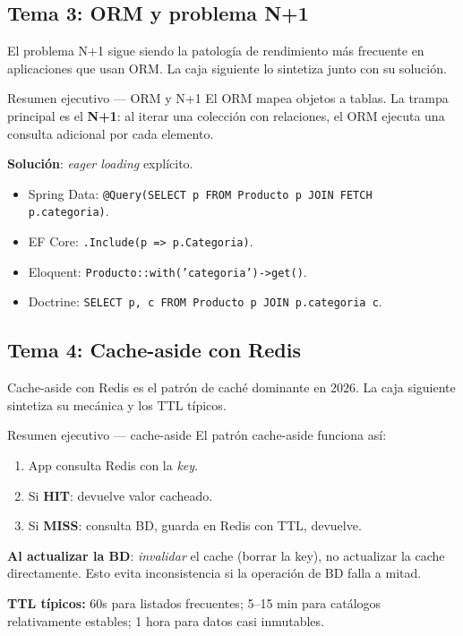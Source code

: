\subsection{Tema 3: ORM y problema N+1}

El problema N+1 sigue siendo la patología de rendimiento
más frecuente en aplicaciones que usan ORM. La caja siguiente lo
sintetiza junto con su solución.


\begin{cajadefinicion}{Resumen ejecutivo --- ORM y N+1}
El ORM mapea objetos a tablas. La trampa principal es el \textbf{N+1}:
al iterar una colección con relaciones, el ORM ejecuta una consulta
adicional por cada elemento.

\textbf{Solución}: \emph{eager loading} explícito.
\begin{itemize}
\item Spring Data: \texttt{@Query(SELECT p FROM Producto p JOIN
FETCH p.categoria)}.
\item EF Core: \texttt{.Include(p => p.Categoria)}.
\item Eloquent: \texttt{Producto::with('categoria')->get()}.
\item Doctrine: \texttt{SELECT p, c FROM Producto p JOIN p.categoria c}.
\end{itemize}
\end{cajadefinicion}

\subsection{Tema 4: Cache-aside con Redis}

Cache-aside con Redis es el patrón de caché dominante en
2026. La caja siguiente sintetiza su mecánica y los TTL típicos.


\begin{cajadefinicion}{Resumen ejecutivo --- cache-aside}
El patrón cache-aside funciona así:

\begin{enumerate}
\item App consulta Redis con la \emph{key}.
\item Si \textbf{HIT}: devuelve valor cacheado.
\item Si \textbf{MISS}: consulta BD, guarda en Redis con TTL,
devuelve.
\end{enumerate}

\textbf{Al actualizar la BD}: \emph{invalidar} el cache (borrar la
key), no actualizar la cache directamente. Esto evita inconsistencia
si la operación de BD falla a mitad.

\textbf{TTL típicos:} 60s para listados frecuentes; 5--15 min para
catálogos relativamente estables; 1 hora para datos casi inmutables.
\end{cajadefinicion}

